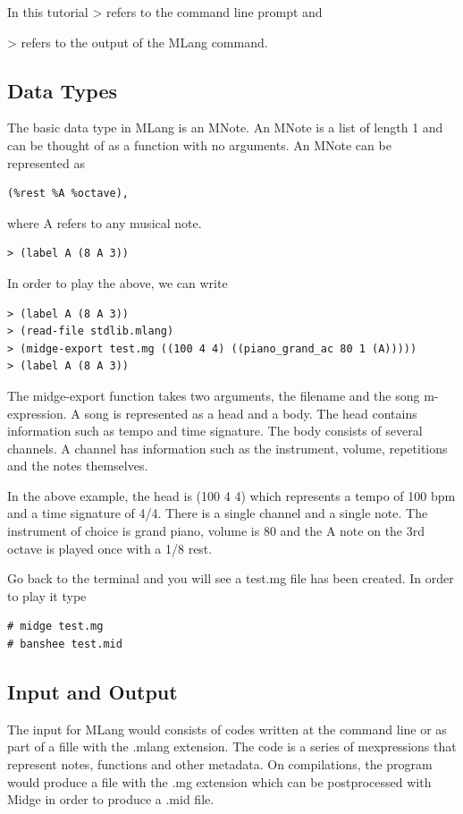 \documentclass[letterpaper,11pt]{article}
\begin{document}
In this tutorial > refers to the command line prompt and {> refers to the
output of the MLang command.

\subsection{Data Types}
The basic data type in MLang is an MNote. An MNote is a list of length 1
and can be thought of as a function with no arguments.
An MNote can be represented as 

\lstset{breaklines=true,language=Lisp}
\begin{lstlisting}
(%rest %A %octave), 
\end{lstlisting}

where A refers to any musical note.
\lstset{breaklines=true,language=Lisp}
\begin{lstlisting}
> (label A (8 A 3))
\end{lstlisting}

In order to play the above, we can write

\lstset{breaklines=true,language=Lisp}
\begin{lstlisting}
> (label A (8 A 3))
> (read-file stdlib.mlang)
> (midge-export test.mg ((100 4 4) ((piano_grand_ac 80 1 (A)))))
> (label A (8 A 3))
\end{lstlisting}
The midge-export function takes two arguments, the filename and the song m-expression. A song is represented as a head and a body. The head contains
information such as tempo and time signature. The body consists of several channels. A channel has information such as the instrument, volume, repetitions and the notes themselves.

In the above example, the head is (100 4 4) which represents a tempo of 100 bpm and a time signature of 4/4.
There is a single channel and a single note. The instrument of choice is grand piano, volume is 80 and the A note on the 3rd octave is played once
with a 1/8 rest.

Go back to the terminal and you will see a test.mg file has been created. In order to play it type

\lstset{breaklines=true,language=bash}
\begin{lstlisting}
# midge test.mg
# banshee test.mid

\end{lstlisting}

\subsection{Input and Output}
The input for MLang would consists of codes written at the command line or as part of a fille with the .mlang extension.
The code is a series of mexpressions that represent notes, functions and other metadata.
On compilations, the program would produce a file with the .mg extension which can be postprocessed with Midge in order to produce a .mid file.

}
\end{document}
